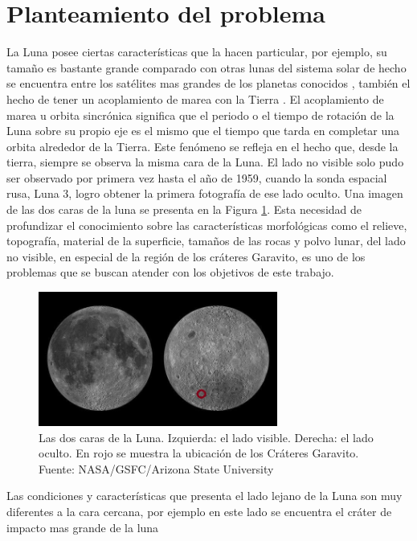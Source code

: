 \documentclass[12pt]{article}
\begin{document}
\newpage
\section{Planteamiento del problema}\label{sec:planteamiento}
La Luna posee ciertas características que la hacen particular, por ejemplo, su tamaño es bastante 
grande comparado con otras lunas del sistema solar de hecho se encuentra entre los satélites mas grandes
de los planetas conocidos \parencite{CarrascoLicea2021}, también el hecho de tener un acoplamiento de 
marea con la Tierra \parencite{Razmi_2005}. El acoplamiento de marea u 
orbita sincrónica significa que el periodo o el tiempo de rotación de la Luna sobre su 
propio eje es el mismo que el tiempo que tarda en completar una orbita alrededor de la 
Tierra. Este fenómeno se refleja en el hecho que, desde la tierra, siempre se observa 
la misma cara de la Luna. El lado no visible solo pudo ser observado por primera vez hasta 
el año de 1959, cuando la sonda espacial rusa, Luna 3, logro obtener la primera fotografía 
de ese lado oculto. Una imagen de las dos caras de la luna se presenta en la Figura \ref{fig:caras_luna}.
Esta necesidad de profundizar el conocimiento sobre las características morfológicas como  el relieve, 
topografía, material de la superficie, tamaños de las rocas 
y polvo lunar, del lado no visible, en especial de la región de los cráteres Garavito, 
es uno de los problemas que se buscan atender con los objetivos de este trabajo.
\\
\begin{figure}[H]
    \includegraphics[width=0.7\textwidth]{images/Moon_sides.jpg}
    \centering
    \caption{Las dos caras de la Luna. Izquierda: el lado visible. Derecha: el lado 
    oculto. En rojo se muestra la ubicación de los Cráteres Garavito. 
    Fuente: NASA/GSFC/Arizona State University}
    \label{fig:caras_luna}
\end{figure}
Las condiciones y características que presenta el lado lejano de la Luna son muy diferentes 
a la cara cercana, por ejemplo en este lado se encuentra el cráter de impacto mas grande de la luna 
\end{document}
